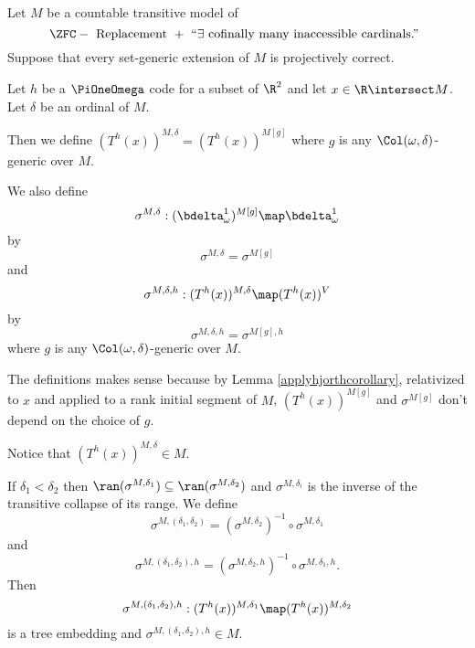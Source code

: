 \documentclass[oneside,12pt]{amsart}
\begin{document}
\begin{definition}
\label{T_at_delta}
Let $M$ be a countable transitive model of
$$\ZFC - \text{ Replacement } +
\text{ ``} \exists \text{ cofinally many inaccessible cardinals.'' }$$
Suppose that every set-generic extension of $M$ is projectively correct.

Let $h$ be a $\PiOneOmega$ code for a subset
of $\R^2$ and let $x\in\R\intersect M$.
Let $\delta$ be an ordinal of $M$.

Then we define $(T^h(x))^{M,\delta}=(T^h(x))^{M[g]}$ where $g$ is any
$\Col(\omega,\delta)$-generic over $M$.

We also define
$$\sigma^{M,\delta}:(\bdelta^1_{\omega})^{M[g]}\map \bdelta^1_{\omega}$$
by
$$\sigma^{M,\delta}=\sigma^{M[g]}$$
and
$$\sigma^{M,\delta,h}:(T^h(x))^{M,\delta} \map (T^h(x))^V$$
 by
$$\sigma^{M,\delta,h}=\sigma^{M[g],h}$$
where $g$ is any
$\Col(\omega,\delta)$-generic over $M$.

The definitions makes sense because by Lemma \ref{applyhjorthcorollary}, relativized to $x$
and applied to a rank initial segment of $M$,
$(T^h(x))^{M[g]}$ and $\sigma^{M[g]}$ don't depend on the choice of $g$.

Notice that $(T^h(x))^{M,\delta}\in M$.

If $\delta_1<\delta_2$ then $\ran(\sigma^{M,\delta_1})\subseteq \ran(\sigma^{M,\delta_2})$
and $\sigma^{M,\delta_i}$ is the inverse of the transitive collapse of its range.
We define
$$\sigma^{M,(\delta_1,\delta_2)} = (\sigma^{M,\delta_2})^{-1}\circ\sigma^{M,\delta_1}$$
and
$$\sigma^{M,(\delta_1,\delta_2),h} = (\sigma^{M,\delta_2,h})^{-1}\circ\sigma^{M,\delta_1,h}.$$
Then
$$\sigma^{M,(\delta_1,\delta_2),h}:(T^h(x))^{M,\delta_1}\map (T^h(x))^{M,\delta_2}$$
is a tree embedding and $\sigma^{M,(\delta_1,\delta_2),h}\in M.$
\end{definition}









\end{document}
